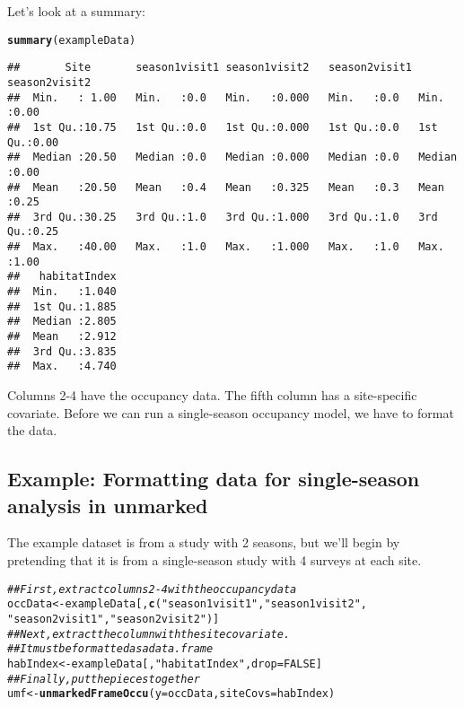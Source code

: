 \documentclass[12pt]{article}\usepackage[]{graphicx}\usepackage[]{xcolor}
\makeatletter
\newcommand{\hlnum}[1]{\textcolor[rgb]{0.686,0.059,0.569}{#1}}%
\newcommand{\hlstr}[1]{\textcolor[rgb]{0.192,0.494,0.8}{#1}}%
\newcommand{\hlcom}[1]{\textcolor[rgb]{0.678,0.584,0.686}{\textit{#1}}}%
\newcommand{\hlstd}[1]{\textcolor[rgb]{0.345,0.345,0.345}{#1}}%
\newcommand{\hlkwb}[1]{\textcolor[rgb]{0.69,0.353,0.396}{#1}}%
\newcommand{\hlkwc}[1]{\textcolor[rgb]{0.333,0.667,0.333}{#1}}%
\newcommand{\hlkwd}[1]{\textcolor[rgb]{0.737,0.353,0.396}{\textbf{#1}}}%
\newenvironment{kframe}{%
 \def\at@end@of@kframe{}%
 \ifinner\ifhmode%
  \def\at@end@of@kframe{\end{minipage}}%
  \begin{minipage}{\columnwidth}%
 \fi\fi%
 \def\FrameCommand##1{\hskip\@totalleftmargin \hskip-\fboxsep
 \colorbox{shadecolor}{##1}\hskip-\fboxsep
     \hskip-\linewidth \hskip-\@totalleftmargin \hskip\columnwidth}%
 \MakeFramed {\advance\hsize-\width
   \@totalleftmargin\z@ \linewidth\hsize
   \@setminipage}}%
 {\par\unskip\endMakeFramed%
 \at@end@of@kframe}
\newenvironment{knitrout}{}{} %
\makeatother
\begin{document}
\newpage
Let's look at a summary:

\begin{knitrout}\footnotesize
{}\color{fgcolor}\begin{kframe}
\begin{alltt}
\hlkwd{summary}\hlstd{(exampleData)}
\end{alltt}
\begin{verbatim}
##       Site       season1visit1 season1visit2   season2visit1 season2visit2 
##  Min.   : 1.00   Min.   :0.0   Min.   :0.000   Min.   :0.0   Min.   :0.00  
##  1st Qu.:10.75   1st Qu.:0.0   1st Qu.:0.000   1st Qu.:0.0   1st Qu.:0.00  
##  Median :20.50   Median :0.0   Median :0.000   Median :0.0   Median :0.00  
##  Mean   :20.50   Mean   :0.4   Mean   :0.325   Mean   :0.3   Mean   :0.25  
##  3rd Qu.:30.25   3rd Qu.:1.0   3rd Qu.:1.000   3rd Qu.:1.0   3rd Qu.:0.25  
##  Max.   :40.00   Max.   :1.0   Max.   :1.000   Max.   :1.0   Max.   :1.00  
##   habitatIndex  
##  Min.   :1.040  
##  1st Qu.:1.885  
##  Median :2.805  
##  Mean   :2.912  
##  3rd Qu.:3.835  
##  Max.   :4.740
\end{verbatim}
\end{kframe}
\end{knitrout}

Columns 2-4 have the occupancy data. The fifth column has a
site-specific covariate. Before we can run a single-season occupancy
model, we have to format the data.




\subsection*{Example: Formatting data for single-season analysis in unmarked}


The example dataset is from a study with 2 seasons, but we'll begin by
pretending that it is from a single-season study with 4 surveys at
each site. 


\begin{knitrout}
\color{fgcolor}\begin{kframe}
\begin{alltt}
\hlcom{## First, extract columns 2-4 with the occupancy data}
\hlstd{occData} \hlkwb{<-} \hlstd{exampleData[,}\hlkwd{c}\hlstd{(}\hlstr{"season1visit1"}\hlstd{,} \hlstr{"season1visit2"}\hlstd{,}
                          \hlstr{"season2visit1"}\hlstd{,} \hlstr{"season2visit2"}\hlstd{)]}
\hlcom{## Next, extract the column with the site covariate.}
\hlcom{## It must be formatted as a data.frame}
\hlstd{habIndex} \hlkwb{<-} \hlstd{exampleData[,}\hlstr{"habitatIndex"}\hlstd{,}\hlkwc{drop}\hlstd{=}\hlnum{FALSE}\hlstd{]}
\hlcom{## Finally, put the pieces together}
\hlstd{umf} \hlkwb{<-} \hlkwd{unmarkedFrameOccu}\hlstd{(}\hlkwc{y}\hlstd{=occData,} \hlkwc{siteCovs}\hlstd{=habIndex)}
\end{alltt}
\end{kframe}
\end{knitrout}
\end{document}
